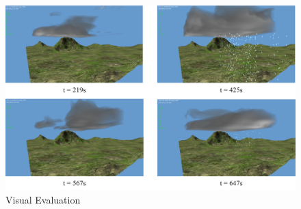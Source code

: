 \begin{figure}[ht!]
	\centering
	\includegraphics[width=\textwidth]{images/visualcomp.png}
	\caption{Visual Evaluation}
	\label{fig:vcom_two}
\end{figure}